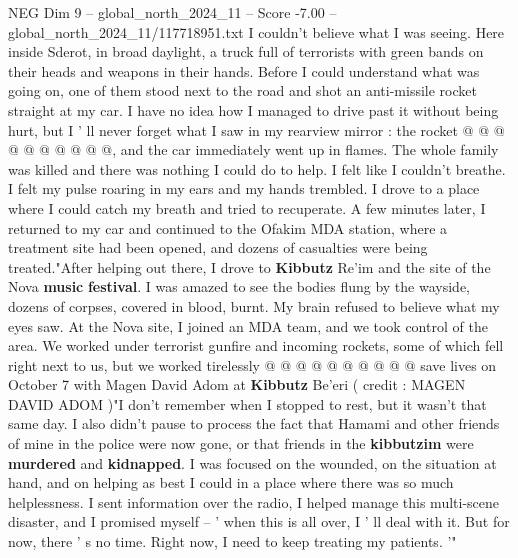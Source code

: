 \begin{textsample}{NEG Dim 9 – global\_north\_2024\_11 – Score -7.00 – global\_north\_2024\_11/117718951.txt}
I couldn't believe what I was seeing.
Here inside Sderot, in broad daylight, a truck full of terrorists with green bands on their heads and weapons in their hands.
Before I could understand what was going on, one of them stood next to the road and shot an anti-missile rocket straight at my car.
I have no idea how I managed to drive past it without being hurt, but I ' ll never forget what I saw in my rearview mirror : the rocket @ @ @ @ @ @ @ @ @ @, and the car immediately went up in flames.
The whole family was killed and there was nothing I could do to help.
I felt like I couldn't breathe.
I felt my pulse roaring in my ears and my hands trembled.
I drove to a place where I could catch my breath and tried to recuperate.
A few minutes later, I returned to my car and continued to the Ofakim MDA station, where a treatment site had been opened, and dozens of casualties were being treated."After helping out there, I drove to \textbf{Kibbutz} Re'im and the site of the Nova \textbf{music} \textbf{festival}.
I was amazed to see the bodies flung by the wayside, dozens of corpses, covered in blood, burnt.
My brain refused to believe what my eyes saw.
At the Nova site, I joined an MDA team, and we took control of the area.
We worked under terrorist gunfire and incoming rockets, some of which fell right next to us, but we worked tirelessly @ @ @ @ @ @ @ @ @ @ save lives on October 7 with Magen David Adom at \textbf{Kibbutz} Be'eri ( credit : MAGEN DAVID ADOM )"I don't remember when I stopped to rest, but it wasn't that same day.
I also didn't pause to process the fact that Hamami and other friends of mine in the police were now gone, or that friends in the \textbf{kibbutzim} were \textbf{murdered} and \textbf{kidnapped}.
I was focused on the wounded, on the situation at hand, and on helping as best I could in a place where there was so much helplessness.
I sent information over the radio, I helped manage this multi-scene disaster, and I promised myself -- ' when this is all over, I ' ll deal with it.
But for now, there ' s no time.
Right now, I need to keep treating my patients. '"

\end{textsample}
